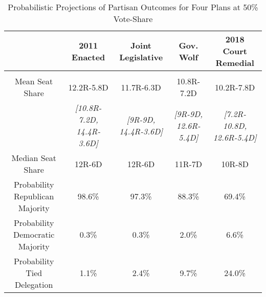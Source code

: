 

\begin{landscape}
\begin{table}[!htbp] \centering 
  \caption{Probabilistic Projections of Partisan Outcomes for Four Plans at 50\% Vote-Share} 
  \label{tab:prob} 
\begin{tabular}{@{\extracolsep{-5pt}} ccccc} 
 & 2011 Enacted & Joint Legislative & Gov. Wolf & 2018 Court Remedial \\ 
\hline \\[-1.8ex] 
Mean Seat Share & 12.2R-5.8D & 11.7R-6.3D & 10.8R-7.2D & 10.2R-7.8D \\ 
 & {\small\textit{[10.8R-7.2D, 14.4R-3.6D]}} & {\small\textit{[9R-9D, 14.4R-3.6D]}} & {\small\textit{[9R-9D, 12.6R-5.4D]}} & {\small\textit{[7.2R-10.8D, 12.6R-5.4D]}} \\ 
Median Seat Share & 12R-6D & 12R-6D & 11R-7D & 10R-8D \\ 
Probability Republican Majority & 98.6\% & 97.3\% & 88.3\% & 69.4\% \\ 
Probability Democratic Majority & 0.3\% & 0.3\% & 2.0\% & 6.6\% \\ 
Probability Tied Delegation & 1.1\% & 2.4\% & 9.7\% & 24.0\% \\ 
\end{tabular}
\end{table}
\end{landscape}
 
 
